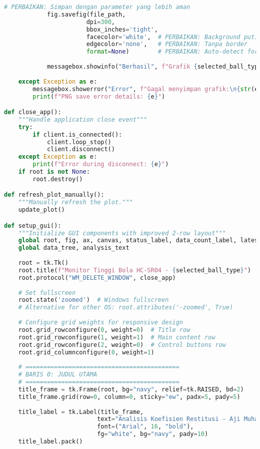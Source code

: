 \begin{itemize}
\begin{scriptsize}
\begin{lstlisting}[language=python]
            # PERBAIKAN: Simpan dengan parameter yang lebih aman
            fig.savefig(file_path, 
                       dpi=300, 
                       bbox_inches='tight',
                       facecolor='white',  # PERBAIKAN: Background putih
                       edgecolor='none',   # PERBAIKAN: Tanpa border
                       format=None)        # PERBAIKAN: Auto-detect format
            
            messagebox.showinfo("Berhasil", f"Grafik {selected_ball_type} disimpan ke {file_path}")
            
    except Exception as e:
        messagebox.showerror("Error", f"Gagal menyimpan grafik:\n{str(e)}")
        print(f"PNG save error details: {e}")

def close_app():
    """Handle application close event"""
    try:
        if client.is_connected():
            client.loop_stop()
            client.disconnect()
    except Exception as e:
        print(f"Error during disconnect: {e}")
    if root is not None:
        root.destroy()

def refresh_plot_manually():
    """Manually refresh the plot."""
    update_plot()

def setup_gui():
    """Initialize GUI components with improved 2-row layout"""
    global root, fig, ax, canvas, status_label, data_count_label, latest_data_label
    global data_tree, analysis_text
    
    root = tk.Tk()
    root.title(f"Monitor Tinggi Bola HC-SR04 - {selected_ball_type}")
    root.protocol("WM_DELETE_WINDOW", close_app)
    
    # Set fullscreen
    root.state('zoomed')  # Windows fullscreen
    # Alternative for other OS: root.attributes('-zoomed', True)
    
    # Configure grid weights for responsive design
    root.grid_rowconfigure(0, weight=0)  # Title row
    root.grid_rowconfigure(1, weight=1)  # Main content row
    root.grid_rowconfigure(2, weight=0)  # Control buttons row
    root.grid_columnconfigure(0, weight=1)
    
    # ===========================================
    # BARIS 0: JUDUL UTAMA
    # ===========================================
    title_frame = tk.Frame(root, bg="navy", relief=tk.RAISED, bd=2)
    title_frame.grid(row=0, column=0, sticky="ew", padx=5, pady=5)
    
    title_label = tk.Label(title_frame, 
                          text="Analisis Koefisien Restitusi - Aji Muhamad Pranata (1217030004)",
                          font=("Arial", 16, "bold"),
                          fg="white", bg="navy", pady=10)
    title_label.pack()
    

\end{lstlisting}
\end{scriptsize}
\end{itemize}
